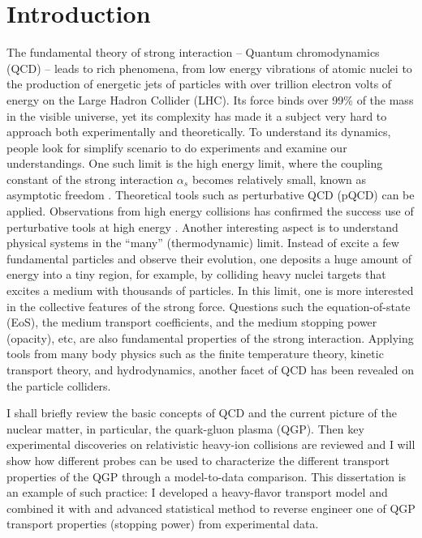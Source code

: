 \chapter{Introduction}
\label{chapter:introduction}
The fundamental theory of strong interaction -- Quantum chromodynamics (QCD) -- leads to rich phenomena, from low energy vibrations of atomic nuclei to the production of energetic jets of particles with over trillion electron volts of energy on the Large Hadron Collider (LHC).
Its force binds over 99\% of the mass in the visible universe, yet its complexity has made it a subject very hard to approach both experimentally and theoretically.
To understand its dynamics, people look for simplify scenario to do experiments and examine our understandings.
One such limit is the high energy limit, where the coupling constant of the strong interaction $\alpha_s$ becomes relatively small, known as asymptotic freedom \cite{Gross:1973id,Politzer:1973fx}. 
Theoretical tools such as perturbative QCD (pQCD) can be applied.
Observations from high energy collisions has confirmed the success use of perturbative tools at high energy \cite{RevModPhys.59.465}.
Another interesting aspect is to understand physical systems in the ``many'' (thermodynamic) limit.
Instead of excite a few fundamental particles and observe their evolution, one deposits a huge amount of energy into a tiny region, for example, by colliding heavy nuclei targets that excites a medium with thousands of particles. 
In this limit, one is more interested in the collective features of the strong force.
Questions such the equation-of-state (EoS), the medium transport coefficients, and the medium stopping power (opacity), etc, are also fundamental properties of the strong interaction.
Applying tools from many body physics such as the finite temperature theory, kinetic transport theory, and hydrodynamics, another facet of QCD has been revealed on the particle colliders.

I shall briefly review the basic concepts of QCD and the current picture of the nuclear matter, in particular, the quark-gluon plasma (QGP). 
Then key experimental discoveries on relativistic heavy-ion collisions are reviewed and I will show how different probes can be used to characterize the different transport properties of the QGP through a model-to-data comparison.
This dissertation is an example of such practice: I developed a heavy-flavor transport model and combined it with and advanced statistical method to reverse engineer one of QGP transport properties (stopping power) from experimental data.

